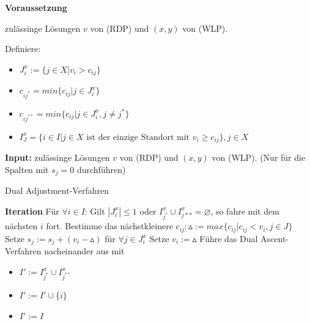         \par \textbf{Voraussetzung}
        \par zulässinge Lösungen $v$ von (RDP) und $(x, y)$ von (WLP).

        Definiere:
        \begin{itemize}
          \item $J_i^x := \{j \in X | v_i > c_{ij}\}$
          \item $c_{ij^*} = min\{c_{ij} | j \in J_i^x\}$
          \item $c_{ij^{**}} = min\{c_{ij} | j \in J_i^x, j \neq j^*\}$
          \item $I_J^x = \{i \in I | j \in X \text{ ist der einzige Standort mit } v_i \geq c_{ij}\}, j \in X$ 
        \end{itemize}
        
        

        \begin{algorithm}[H]
          \textbf{Input:} zulässinge Lösungen $v$ von (RDP) und $(x, y)$ von (WLP). (Nur für die Spalten mit $s_j = 0$ durchführen)
          \begin{algorithmic}[1]
            \caption{Dual Adjustment-Verfahren}
            \State \textbf{Iteration}
            \State Für $\forall i \in I$:
            \State Gilt $|J_i^x| \leq 1$ oder $I_{j^*}^x \cup I_{j**}^x = \varnothing$, so fahre mit dem nächsten $i$ fort.
            \State Bestimme das nächstkleinere $c_{ij}: \vartriangle := max\{c_{ij}|c_{ij} < v_i, j \in J\}$
            \State Setze $s_j := s_j + (v_i - \vartriangle)$ für $\forall j \in J_i^x$
            \State Setze $v_i:= \vartriangle$
            \State Führe das Dual Ascent-Verfahren nacheinander aus mit
            \begin{itemize}
              \item $I':=I_{j^*}^x \cup I_{j^{**}}^x$
              \item $I':= I' \cup \{i\}$
              \item $I':= I$
            \end{itemize}

            \end{algorithmic}
        \end{algorithm}

      \begin{exmp}
        
      \end{exmp}

